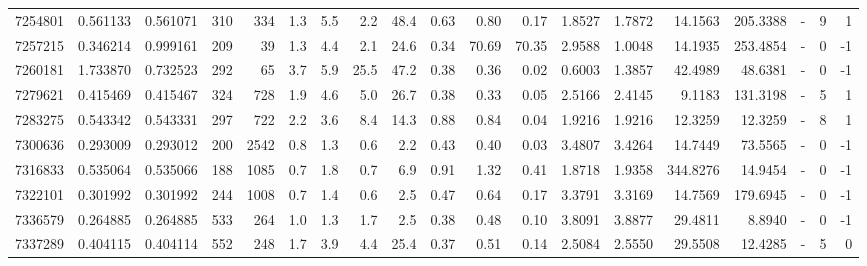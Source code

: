 \begin{tabular}{rrrrrrrrrrrrrrrrlrr}
   7254801 & 0.561133 &   0.561071 &  310 &  334 &      1.3 &      5.5 &     2.2 &     48.4 &       0.63 &        0.80 &        0.17 &  1.8527 &  1.7872 &   14.1563 &  205.3388 &             - &        9 &          1 \\
   7257215 & 0.346214 &   0.999161 &  209 &   39 &      1.3 &      4.4 &     2.1 &     24.6 &       0.34 &       70.69 &       70.35 &  2.9588 &  1.0048 &   14.1935 &  253.4854 &             - &        0 &         -1 \\
   7260181 & 1.733870 &   0.732523 &  292 &   65 &      3.7 &      5.9 &    25.5 &     47.2 &       0.38 &        0.36 &        0.02 &  0.6003 &  1.3857 &   42.4989 &   48.6381 &             - &        0 &         -1 \\
   7279621 & 0.415469 &   0.415467 &  324 &  728 &      1.9 &      4.6 &     5.0 &     26.7 &       0.38 &        0.33 &        0.05 &  2.5166 &  2.4145 &    9.1183 &  131.3198 &             - &        5 &          1 \\
   7283275 & 0.543342 &   0.543331 &  297 &  722 &      2.2 &      3.6 &     8.4 &     14.3 &       0.88 &        0.84 &        0.04 &  1.9216 &  1.9216 &   12.3259 &   12.3259 &             - &        8 &          1 \\
   7300636 & 0.293009 &   0.293012 &  200 & 2542 &      0.8 &      1.3 &     0.6 &      2.2 &       0.43 &        0.40 &        0.03 &  3.4807 &  3.4264 &   14.7449 &   73.5565 &             - &        0 &         -1 \\
   7316833 & 0.535064 &   0.535066 &  188 & 1085 &      0.7 &      1.8 &     0.7 &      6.9 &       0.91 &        1.32 &        0.41 &  1.8718 &  1.9358 &  344.8276 &   14.9454 &             - &        0 &         -1 \\
   7322101 & 0.301992 &   0.301992 &  244 & 1008 &      0.7 &      1.4 &     0.6 &      2.5 &       0.47 &        0.64 &        0.17 &  3.3791 &  3.3169 &   14.7569 &  179.6945 &             - &        0 &         -1 \\
   7336579 & 0.264885 &   0.264885 &  533 &  264 &      1.0 &      1.3 &     1.7 &      2.5 &       0.38 &        0.48 &        0.10 &  3.8091 &  3.8877 &   29.4811 &    8.8940 &             - &        0 &         -1 \\
   7337289 & 0.404115 &   0.404114 &  552 &  248 &      1.7 &      3.9 &     4.4 &     25.4 &       0.37 &        0.51 &        0.14 &  2.5084 &  2.5550 &   29.5508 &   12.4285 &             - &        5 &          0 \\

\end{tabular}
